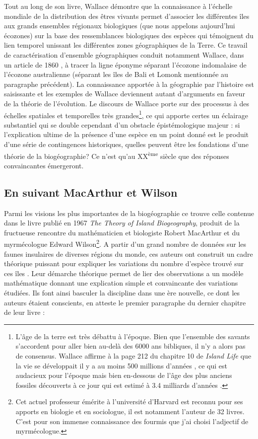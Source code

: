 Tout au long de son livre, Wallace démontre que la connaissance à
l'échelle mondiale de la distribution des êtres vivants permet
d'associer les différentes îles aux grands ensembles régionaux
biologiques (que nous appelons aujourd'hui écozones) sur la base des
ressemblances biologiques des espèces qui témoignent du lien temporel
unissant les différentes zones géographiques de la Terre. Ce travail de
caractérisation d'ensemble géographiques conduit notamment Wallace, dans
un article de 1860 \citep{Wallace1860}, à tracer la ligne éponyme
séparant l'écozone indomalaise de l'écozone australienne (séparant les
îles de Bali et Lomonk mentionnée au paragraphe précédent). La
connaissance apportée à la géographie par l'histoire est saisissante et
les exemples de Wallace deviennent autant d'arguments en faveur de la
théorie de l'évolution. Le discours de Wallace porte sur des processus à
des échelles spatiales et temporelles très grandes\footnote{L'âge de la
  terre est très débattu à l'époque. Bien que l'ensemble des savants
  s'accordent pour aller bien au-delà des 6000 ans bibliques, il n'y a
  alors pas de consensus. Wallace affirme à la page 212 du chapitre 10
  de \emph{Island Life} que la vie se développait il y a au moins 500
  millions d'années \citep{wallace1881island}, ce qui est audacieux pour
  l'époque mais bien en-dessous de l'âge des plus anciens fossiles
  découverts à ce jour qui est estimé à 3.4 milliards d'années
  \citep{Wacey2011}.}, ce qui apporte certes un éclairage substantiel
qui se double cependant d'un obstacle épistémologique majeur : si
l'explication ultime de la présence d'une espèce en un point donné est
le produit d'une série de contingences historiques, quelles peuvent être
les fondations d'une théorie de la biogéographie? Ce n'est qu'au
XX\textsuperscript{ème} siècle que des réponses convaincantes
émergeront.

\subsection*{En suivant MacArthur et
Wilson}\label{en-suivant-macarthur-et-wilson}

Parmi les visions les plus importantes de la biogéographie ce trouve
celle contenue dans le livre publié en 1967 \emph{The Theory of Island
Biogeography}, produit de la fructueuse rencontre du mathématicien et
biologiste Robert MacArthur et du myrmécologue Edward Wilson\footnote{Cet
  actuel professeur émérite à l'université d'Harvard est reconnu pour
  ses apports en biologie et en sociologue, il est notamment l'auteur de
  32 livres. C'est pour son immense connaissance des fourmis que j'ai
  choisi l'adjectif de myrmécologue.}. A partir d'un grand nombre de
données sur les faunes insulaires de diverses régions du monde, ces
auteurs ont construit un cadre théorique puissant pour expliquer les
variations du nombre d'espèce trouvé sur ces îles \citep{MacArthur1967}.
Leur démarche théorique permet de lier des observations a un modèle
mathématique donnant une explication simple et convaincante des
variations étudiées. Ils font ainsi basculer la discipline dans une ère
nouvelle, ce dont les auteurs étaient conscients, en atteste le premier
paragraphe du dernier chapitre de leur livre :

